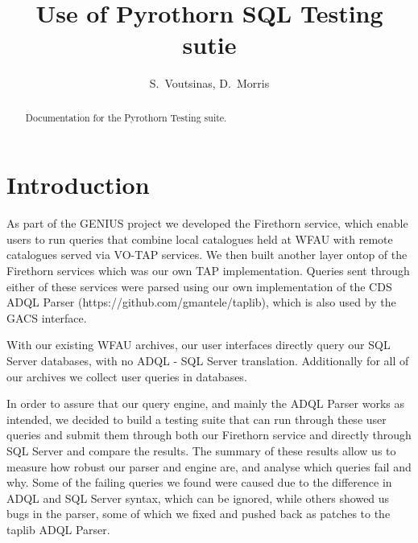 \documentclass[review,5p,authoryear,12pt]{elsarticle}
\begin{document}
\begin{frontmatter}

\title{Use of Pyrothorn SQL Testing sutie}

\author{S.~Voutsinas, D.~Morris} 


\address{Institute for Astronomy, School of Physics and Astronomy, University of Edinburgh, Royal Observatory,
Blackford Hill, EH9~3HJ, UK}

\begin{abstract}
Documentation for the Pyrothorn Testing suite.
\end{abstract}

\begin{keyword}


\end{keyword}

\end{frontmatter}

\section{Introduction}
\label{sec:intro}

As part of the GENIUS project we developed the Firethorn service, which enable users to run queries that combine local catalogues held at WFAU with remote catalogues served via VO-TAP services. We then built another layer ontop of the Firethorn services which was our own TAP implementation. Queries sent through either of these services were parsed using our own implementation of the CDS ADQL Parser (https://github.com/gmantele/taplib), which is also used by the GACS interface. 

With our existing WFAU archives, our user interfaces directly query our SQL Server databases, with no ADQL - SQL Server translation. Additionally for all of our archives we collect user queries in databases. 

In order to assure that our query engine, and mainly the ADQL Parser works as intended, we decided to build a testing suite that can run through these user queries and submit them through both our Firethorn service and directly through SQL Server and compare the results. The summary of these results allow us to measure how robust our parser and engine are, and analyse which queries fail and why. Some of the failing queries we found were caused due to the difference in ADQL and SQL Server syntax, which can be ignored, while others showed us bugs in the parser, some of which we fixed and pushed back as patches to the taplib ADQL Parser.
\end{document}
